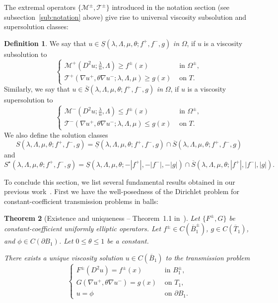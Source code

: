 \documentclass[letter,11pt]{amsart}
\newcommand{\mcal}{\mathcal{M}}
\newcommand{\tcal}{\mathcal{T}}
\newtheorem{thm}{Theorem}[section]
\theoremstyle{definition}
\newtheorem{defn}[thm]{Definition}
\numberwithin{equation}{section}
\begin{document}
The extremal operators $\{\mcal^{\pm}, \tcal^{\pm}\}$ introduced in the notation section (see subsection~\ref{sub:notation} above) give rise to universal viscosity subsolution and supersolution classes:
\begin{defn}
We say that $u \in \underline{S}(\lambda,\Lambda,\mu,\theta; f^{+}, f^{-}, g)$\emph{ in }$\Omega$, if $u$ is a viscosity subsolution to 
\[
\begin{cases}
\mcal^{+}(D^2 u; \frac{\lambda}{n}, \Lambda) \geq f^{\pm}(x) & \text{ in } \Omega^{\pm},\\
\tcal^{+}(\nabla u^{+}, \theta \nabla u^{-}; \lambda,\Lambda,\mu) \geq g(x) & \text{ on } T.
\end{cases}
\]
Similarly, we say that $u \in \overline{S}(\lambda,\Lambda,\mu,\theta; f^{+}, f^{-}, g)$\emph{ in }$\Omega$, if $u$ is a viscosity supersolution to
\[
\begin{cases}
\mcal^{-}(D^2 u; \frac{\lambda}{n}, \Lambda) \leq f^{\pm}(x) & \text{ in } \Omega^{\pm},\\
\tcal^{-}(\nabla u^{+}, \theta \nabla u^{-}; \lambda,\Lambda,\mu) \leq g(x) & \text{ on } T.
\end{cases}
\]
We also define the solution classes
\[
S(\lambda,\Lambda,\mu,\theta; f^{+}, f^{-}, g) = \underline{S}(\lambda,\Lambda,\mu,\theta; f^{+}, f^{-}, g) \cap \overline{S}(\lambda,\Lambda,\mu,\theta; f^{+}, f^{-}, g)
\]
and
\[
S^{\star}(\lambda,\Lambda,\mu,\theta; f^{+}, f^{-}, g) = \underline{S}(\lambda,\Lambda,\mu, \theta; -|f^{+}|, - |f^{-}|, -|g|) \cap \overline{S}(\lambda,\Lambda,\mu, \theta; |f^{+}|, |f^{-}|, |g|).
\]
\end{defn}

\medskip

To conclude this section, we list several fundamental results obtained in our previous work~\cite{E}.
First we have the well-posedness of the Dirichlet problem for constant-coefficient transmission problems in balls:

\begin{thm}[Existence and uniqueness -- Theorem~1.1 in~\cite{E}]
\label{thm:wellposed}
Let $\{F^{\pm}, G\}$ be constant-coefficient uniformly elliptic operators.
Let $f^{\pm} \in C(\overline{B}_1^{\pm})$, $g \in C(\overline{T}_1)$, and $\phi \in C(\partial B_1)$.
Let $0 \leq \theta \leq 1$ be a constant.

There exists a unique viscosity solution $u \in C(\overline{B}_1)$ to the transmission problem
\[
\begin{cases}
F^{\pm}(D^2u) = f^{\pm}(x) & \text{ in } B_1^{\pm},\\
G(\nabla u^{+}, \theta \nabla u^{-}) =g(x) & \text{ on } T_1,\\
u = \phi & \text{ on } \partial B_1.
\end{cases}
\]
\end{thm}
\end{document}
